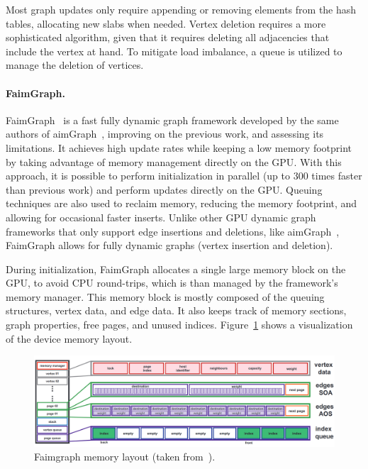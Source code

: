     Most graph updates only require appending or removing elements from the hash tables, allocating new slabs when needed. Vertex deletion requires a more sophisticated algorithm, given that it requires deleting all adjacencies that include the vertex at hand. To mitigate load imbalance, a queue is utilized to manage the deletion of vertices. 

    \paragraph{\textbf{FaimGraph}.}
    FaimGraph~\cite{paper:faimgraph} is a fast fully dynamic graph framework developed by the same authors of aimGraph~\cite{paper:aimgraph}, improving on the previous work, and assessing its limitations. It achieves high update rates while keeping a low memory footprint by taking advantage of memory management directly on the \gls{GPU}. With this approach, it is possible to perform initialization in parallel (up to 300 times faster than previous work) and perform updates directly on the \gls{GPU}. Queuing techniques are also used to reclaim memory, reducing the memory footprint, and allowing for occasional faster inserts. Unlike other \gls{GPU} dynamic graph frameworks that only support edge insertions and deletions, like aimGraph~\cite{paper:aimgraph}, FaimGraph allows for fully dynamic graphs (vertex insertion and deletion).

    During initialization, FaimGraph allocates a single large memory block on the \gls{GPU}, to avoid \gls{CPU} round-trips, which is than managed by the framework's memory manager. This memory block is mostly composed of the queuing structures, vertex data, and edge data. It also keeps track of memory sections, graph properties, free pages, and unused indices. Figure~\ref{fig:faimgraph_data_structure} shows a visualization of the device memory layout.

    \begin{figure}[tbp]
        \centering
        \includegraphics[width=1.0\textwidth]{Chapters/Figures/Images/faimgraph_ds.png}
        \caption{Faimgraph memory layout (taken from~\cite{paper:faimgraph}).}
        \label{fig:faimgraph_data_structure}
    \end{figure}

